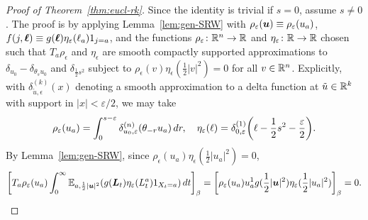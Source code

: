 \documentclass[11pt,a4paper]{article}
\let\originalleft\left
\let\originalright\right
\renewcommand{\left}{\mathopen{}\mathclose\bgroup\originalleft}
\renewcommand{\right}{\aftergroup\egroup\originalright}
\begin{document}
\begin{proof}[Proof of Theorem~\ref{thm:eucl-rk}]
  Since the identity is trivial if $s=0$, assume $s\neq 0$.  The proof
  is by applying Lemma~\ref{lem:gen-SRW} with
  $\rho_{\varepsilon}(\boldsymbol{u}) \equiv \rho_{\varepsilon}(u_{a})$,
  $f(j,\boldsymbol{\ell}) \equiv g(\boldsymbol{\ell})\eta_{\varepsilon}(\ell_a) 1_{j=a}$, and the functions
  $\rho_{\varepsilon} \colon \mathbb{R}^n \to \mathbb{R}$ and $\eta_{\varepsilon} \colon\mathbb{R}\to\mathbb{R}$ chosen such that
  $T_{a}\rho_{\epsilon}$ and $\eta_{\epsilon}$ are smooth compactly supported approximations
  to $\delta_{ u_0}-\delta_{\theta_s u_0}$ and
  $\delta_{\frac{1}{2}s^{2}}$ subject to
  $\rho_{\epsilon}(v)\eta_{\epsilon}(\frac{1}{2}|v|^{2})=0$ for all $v\in \mathbb{R}^n$. Explicitly,
  with $\delta^{(k)}_{\tilde u, \epsilon}(x)$ denoting a smooth
  approximation to a delta function at $\tilde u\in \mathbb{R}^{k}$ with
  support in $|x|<\varepsilon/2$, we may take
  \begin{equation}
    \rho_{\epsilon}(u_a) = \int_0^{s-\varepsilon}\delta_{u_{0},\varepsilon}^{(n)}(\theta_{-r}u_a)\, dr,
    \quad \eta_{\epsilon}(\ell) =
    \delta_{0,\varepsilon}^{(1)}\left(\ell- \frac12 s^2 - \frac{\varepsilon}{2}\right).
  \end{equation}
%
  By Lemma~\ref{lem:gen-SRW}, since $\rho_{\epsilon}(u_a)\eta_{\epsilon}(\frac{1}{2}|u_a|^2) = 0$,
  \begin{equation}
    \label{eq:tlim}
    \uspin{T_a\rho_{\varepsilon}(u_a)\int_0^\infty \E_{a,\frac{1}{2}|\V{u}|^2}(g(\V{L}_t)\eta_\varepsilon(L_t^a)1_{X_t=a}) \, dt}_{\beta}
    =
    \uspin{\rho_\varepsilon(u_a)u_{a}^{1} g( \frac{1}{2}
      |\V{u}|^{2})\eta_{\varepsilon} 
      (\frac{1}{2}|u_a|^2)}_{\beta} = 0.
  \end{equation}


\end{proof}
\end{document}
